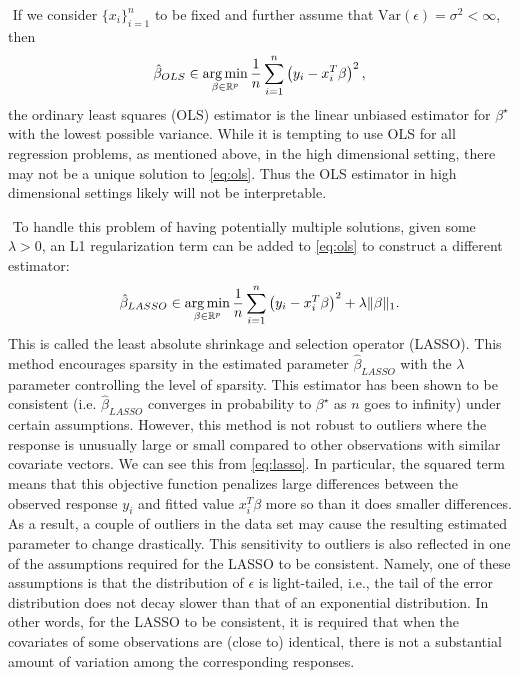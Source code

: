 $ $\newline
If we consider $\{x_i\}_{i=1}^n$ to be fixed and further assume that $\text{Var}(\epsilon) = \sigma^2 < \infty$, then
\begin{align}
\hat{\beta}_{OLS} \in \argmin_{\beta\in\mathbb{R}^p}\frac{1}{n}\sum_{i=1}^n \left( y_i - x_i^T\beta \right)^2, \label{eq:ols}
\end{align}
the ordinary least squares (OLS) estimator is the linear unbiased estimator for $\beta^\star$ with the lowest possible variance. While it is tempting to use OLS for all regression problems, as mentioned above, in the high dimensional setting, there may not be a unique solution to \cref{eq:ols}. Thus the OLS estimator in high dimensional settings likely will not be interpretable.

$ $\newline
To handle this problem of having potentially multiple solutions, given some $\lambda>0$, an L1 regularization term can be added to \cref{eq:ols} to construct a different estimator:
\begin{align}
\hat{\beta}_{LASSO} \in \argmin_{\beta\in\mathbb{R}^p} \frac{1}{n}\sum_{i=1}^n \left( y_i - x_i^T\beta \right)^2 + \lambda\|\beta\|_1. \label{eq:lasso}
\end{align}
This is called the least absolute shrinkage and selection operator (LASSO). This method encourages sparsity in the estimated parameter $\hat{\beta}_{LASSO}$ with the $\lambda$ parameter controlling the level of sparsity. This estimator has been shown to be consistent (i.e. $\hat{\beta}_{LASSO}$ converges in probability to $\beta^\star$ as $n$ goes to infinity) under certain assumptions. However, this method is not robust to outliers where the response is unusually large or small compared to other observations with similar covariate vectors. We can see this from \cref{eq:lasso}. In particular, the squared term means that this objective function penalizes large differences between the observed response $y_i$ and fitted value $x_i^T\beta$ more so than it does smaller differences. As a result, a couple of outliers in the data set may cause the resulting estimated parameter to change drastically. This sensitivity to outliers is also reflected in one of the assumptions required for the LASSO to be consistent. Namely, one of these assumptions is that the distribution of $\epsilon$ is light-tailed, i.e., the tail of the error distribution does not decay slower than that of an exponential distribution. In other words, for the LASSO to be consistent, it is required that when the covariates of some observations are (close to) identical, there is not a substantial amount of variation among the corresponding responses. 

